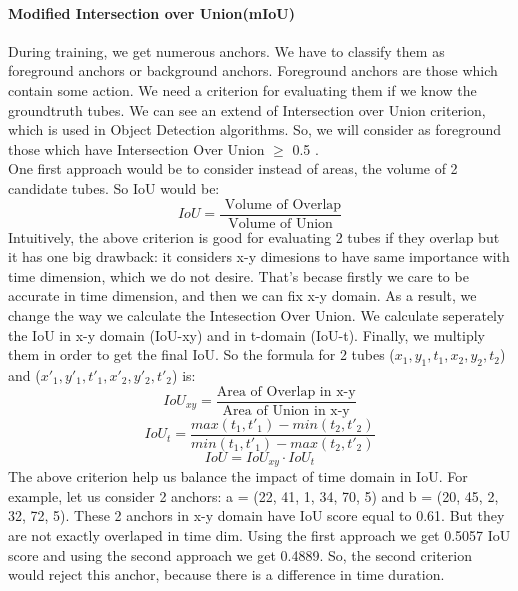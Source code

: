 \documentclass{report}
\begin{document}
\paragraph{Modified Intersection over Union(mIoU)}
During training, we get numerous anchors. We have to classify them as foreground anchors or
background anchors. Foreground anchors are those which contain some action. We need a criterion
for evaluating them if we know the groundtruth tubes. We can see an extend of Intersection over Union
criterion, which is used in Object Detection algorithms. So, we will consider as foreground those which
have Intersection Over Union $\ge$ 0.5 . \\
One first approach would be to consider instead of areas, the volume of 2 candidate tubes. So IoU would be:
\[ IoU = \frac{\text{ Volume of Overlap} }{\text{Volume of Union}} \]
Intuitively, the above criterion is good for evaluating 2 tubes if they overlap but it has one big drawback:
it considers x-y dimesions to have same importance with time dimension, which we do not desire. That's becase
firstly we care to be accurate in time dimension, and then we can fix x-y domain.
As a result, we change the way we calculate the Intesection Over Union. We calculate seperately
the IoU in x-y domain (IoU-xy) and in t-domain (IoU-t). Finally, we multiply them in order to get the final IoU.
So the formula for 2 tubes ($x_1, y_1, t_1, x_2, y_2, t_2$) and ($x'_1, y'_1, t'_1, x'_2, y'_2, t'_2$) is:
\[ IoU_{xy} = \frac{ \text{Area of Overlap in x-y}} { \text{Area of Union in x-y}} \]
\[ IoU_t = \frac { max(t_1, t'_1) - min(t_2, t'_2)} {min(t_1,t'_1) - max(t_2,t'_2)} \]
\[ IoU = IoU_{xy} \cdot  IoU_t \]
The above criterion help us balance the impact of time domain in IoU. For example, let us consider 2 anchors:
a = (22, 41, 1, 34, 70, 5) and b = (20, 45, 2, 32, 72, 5). These 2 anchors in x-y domain have IoU score equal to 0.61.
But they are not exactly overlaped in time dim. Using the first approach we get 0.5057 IoU score and using the
second approach we get 0.4889. So, the second criterion would reject this anchor, because there is a difference in time
duration. 


\par
\end{document}
